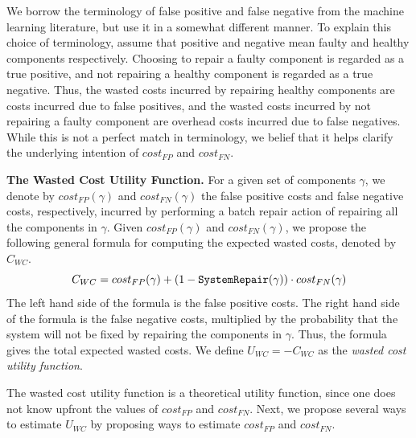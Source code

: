 \documentclass[a4paper,11pt]{report}
\newcommand\meir[1]{\textcolor{red}{meir: #1}}
\newcommand\sysrep[1]{{\tt SystemRepair(#1)}}
\begin{document}


We borrow the terminology of false positive and false negative from the machine learning literature, but use it in a somewhat different manner. To explain this choice of terminology, assume that positive and negative mean faulty and healthy components respectively. Choosing to repair a faulty component is regarded as a true positive, and not repairing a healthy component is regarded as a true negative. Thus, the wasted costs incurred by repairing healthy components are costs incurred due to false positives, and the wasted costs incurred by not repairing a faulty component are overhead costs incurred due to false negatives. While this is not a perfect match in terminology, we belief that it helps clarify the underlying intention of $cost_{FP}$ and $cost_{FN}$.


\noindent \textbf{The Wasted Cost Utility Function.}
For a given set of components $\gamma$, we denote by $cost_{FP}(\gamma)$ and $cost_{FN}(\gamma)$ the false positive costs and false negative costs, respectively, incurred by performing a batch repair action of repairing all the components in $\gamma$. Given $cost_{FP}(\gamma)$ and $cost_{FN}(\gamma)$, we propose the following general formula for computing the expected wasted costs, denoted by $C_{WC}$.
\[ C_{WC}=cost_{FP}(\gamma)+(1-\sysrep{\gamma})\cdot cost_{FN}(\gamma)\]
The left hand side of the formula is the false positive costs. The right hand side of the formula is the false negative costs, multiplied by the probability that the system will not be fixed by repairing the components in $\gamma$. Thus, the formula gives the total expected wasted costs.
We define $U_{WC}=-C_{WC}$ as the {\em wasted cost utility function}.



The wasted cost utility function is a theoretical utility function, since one does not know upfront the values of $cost_{FP}$ and $cost_{FN}$. Next, we propose several ways to estimate $U_{WC}$ by proposing ways to estimate $cost_{FP}$ and $cost_{FN}$.
\end{document}
